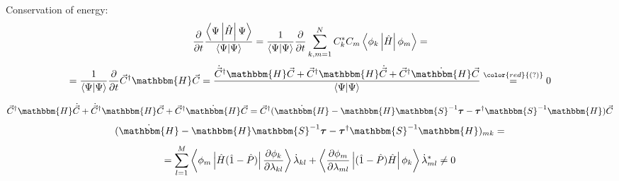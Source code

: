 \begin{frame}{}
\begin{block}{Conservation of energy:}
$$\frac{\partial}{\partial t}\frac{\mymean{\Psi}{\hat{H}}{\Psi}}{\myel{\Psi}{\Psi}} = %
  \frac{1}{\myel{\Psi}{\Psi}}\frac{\partial}{\partial t}\sum_{k,m=1}^NC_k^*C_m\mymean{\phi_k}{\hat{H}}{\phi_m} = $$
$$=\frac{1}{\myel{\Psi}{\Psi}}\frac{\partial}{\partial t}\vec{C}^{\dagger}\mathbbm{H}\vec{C}=%
  \frac{\dot{\vec{C}}^{\dagger}\mathbbm{H}\vec{C}+\vec{C}^{\dagger}\mathbbm{H}\dot{\vec{C}} + \vec{C}^{\dagger}\dot{\mathbbm{H}}\vec{C}}{\myel{\Psi}{\Psi}}\overset{ {\color{red}{(?)}} }{=}0$$

\end{block}
$$\vec{C}^{\dagger}\mathbbm{H}\dot{\vec{C}}+\dot{\vec{C}}^{\dagger}\mathbbm{H}\vec{C}+\vec{C}^{\dagger}\dot{\mathbbm{H}}\vec{C} = %
 \vec{C}^{\dagger}(\dot{\mathbbm{H}}-\mathbbm{H}\mathbbm{S}^{-1}\boldsymbol{\tau}-\boldsymbol{\tau}^{\dagger}\mathbbm{S}^{-1}\mathbbm{H})\vec{C}$$
$$(\dot{\mathbbm{H}} - \mathbbm{H}\mathbbm{S}^{-1}\boldsymbol{\tau}-\boldsymbol{\tau}^{\dagger}\mathbbm{S}^{-1}\mathbbm{H})_{mk}=$$
$$=\sum_{l=1}^M\mymean{\phi_m}%
		      {\hat{H}(\hat{1}-\hat{P})}%
		      {\frac{\partial\phi_k}{\partial\lambda_{kl}}}\dot{\lambda}_{kl}+%
	       \mymean{\frac{\partial\phi_m}{\partial\lambda_{ml}}}%
		      {(\hat{1}-\hat{P})\hat{H}}%
		      {\phi_k}\dot{\lambda}_{ml}^*\neq0$$

\end{frame}

